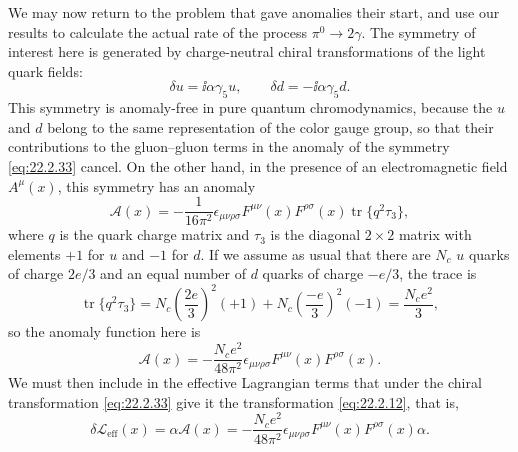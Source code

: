 We may now return to the problem that gave anomalies their start, and use
our results to calculate the actual rate of the process $\pi^0\to2\gamma$.
The symmetry of interest here is generated by charge-neutral chiral
transformations of the light quark fields:
\begin{equation}
 \delta u=\ii\alpha\gamma_5u,\qquad
 \delta d=-\ii\alpha\gamma_5d.
 \tag{22.2.33}\label{eq:22.2.33}
\end{equation}
This symmetry is anomaly-free in pure quantum chromodynamics, because the
$u$ and $d$ belong to the same representation of the color gauge group, so
that their contributions to the gluon--gluon terms in the anomaly of the
symmetry \eqref{eq:22.2.33} cancel. On the other hand, in the presence of
an electromagnetic field $A^\mu(x)$, this symmetry has an anomaly
\[
 \mathcal A(x)=-\frac{1}{16\pi^2}\epsilon_{\mu\nu\rho\sigma}
 F^{\mu\nu}(x)F^{\rho\sigma}(x)
 \operatorname{tr}\{q^2\tau_3\},
\]
where $q$ is the quark charge matrix and $\tau_3$ is the diagonal
$2\times2$ matrix with elements $+1$ for $u$ and $-1$ for $d$. If we
assume as usual that there are $N_c$ $u$ quarks of charge $2e/3$ and an
equal number of $d$ quarks of charge $-e/3$, the trace is
\[
 \operatorname{tr}\{q^2\tau_3\}
 =N_c\left(\frac{2e}{3}\right)^2(+1)
 +N_c\left(\frac{-e}{3}\right)^2(-1)
 =\frac{N_ce^2}{3},
\]
so the anomaly function here is
\begin{equation}
 \mathcal A(x)=-\frac{N_ce^2}{48\pi^2}
 \epsilon_{\mu\nu\rho\sigma}F^{\mu\nu}(x)F^{\rho\sigma}(x).
 \tag{22.2.34}\label{eq:22.2.34}
\end{equation}
We must then include in the effective Lagrangian terms that under the
chiral transformation \eqref{eq:22.2.33} give it the transformation
\eqref{eq:22.2.12}, that is,
\begin{equation}
 \delta\mathcal L_{\mathrm{eff}}(x)=\alpha\mathcal A(x)
 =-\frac{N_ce^2}{48\pi^2}\epsilon_{\mu\nu\rho\sigma}
 F^{\mu\nu}(x)F^{\rho\sigma}(x)\alpha.
 \tag{22.2.35}\label{eq:22.2.35}
\end{equation}

